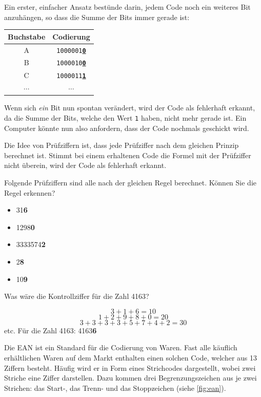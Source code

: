 Ein erster, einfacher Ansatz bestünde darin, jedem Code noch ein weiteres Bit anzuhängen, so dass die Summe der Bits immer gerade ist:

\begin{table}[H]
    \centering
    \begin{tabular}{cc}
        Buchstabe & Codierung                              \\\midrule
        A         & \texttt{1000001\underline{\textbf{0}}} \\\midrule
        B         & \texttt{1000010\underline{\textbf{0}}} \\\midrule
        C         & \texttt{1000011\underline{\textbf{1}}} \\\midrule
        $\cdots$  & $\cdots$
    \end{tabular}
\end{table}

Wenn sich \textit{ein} Bit nun spontan verändert, wird der Code als fehlerhaft erkannt, da die Summe der Bits, welche den Wert \texttt{1} haben, nicht mehr gerade ist. Ein Computer könnte nun also anfordern, dass der Code nochmals geschickt wird.

Die Idee von Prüfziffern ist, dass jede Prüfziffer nach dem gleichen Prinzip berechnet ist. Stimmt bei einem erhaltenen Code die Formel mit der Prüfziffer nicht überein, wird der Code als fehlerhaft erkannt.
\begin{myexercise}
    Folgende Prüfziffern sind alle nach der gleichen Regel berechnet. Können Sie die Regel erkennen?
    \begin{itemize}
        \item 31\textbf{6}
        \item 1298\textbf{0}
        \item 3333574\textbf{2}
        \item 2\textbf{8}
        \item 10\textbf{9}
    \end{itemize}
    Was wäre die Kontrollziffer für die Zahl 4163?

    \begin{myanswer}
        \[3 + 1 + 6 = 10\]
        \[1 + 2 + 9 + 8 + 0 = 20\]
        \[3 + 3 + 3 + 3 + 5 + 7 + 4 + 2=30\]
        etc.
        Für die Zahl 4163: 4163\textbf{6}
    \end{myanswer}
\end{myexercise}

Die \gls{EAN} ist ein Standard für die Codierung von Waren. Fast alle käuflich erhältlichen Waren auf dem Markt enthalten einen solchen Code, welcher aus 13 Ziffern besteht. Häufig wird er in Form eines Strichcodes dargestellt, wobei zwei Striche eine Ziffer darstellen. Dazu kommen drei Begrenzungszeichen aus je zwei Strichen: das Start-, das Trenn- und das Stoppzeichen (siehe \cref{fig:ean}).

